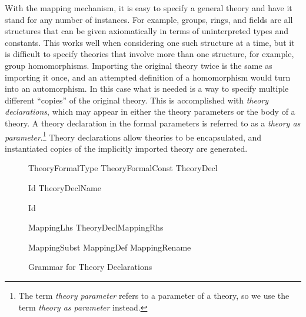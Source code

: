 \documentclass[11pt,twoside,openright,titlepage]{cslreport}
\def\mapb{\char"7B\char"7B}
\def\mape{\char"7D\char"7D}
\begin{document}
With the mapping mechanism, it is easy to specify a general theory and
have it stand for any number of instances.  For example, groups, rings,
and fields are all structures that can be given axiomatically in terms of
uninterpreted types and constants.  This works well when considering one
such structure at a time, but it is difficult to specify theories that
involve more than one structure, for example, group homomorphisms.
Importing the original theory twice is the same as importing it once, and
an attempted definition of a homomorphism would turn into an automorphism.
In this case what is needed is a way to specify multiple different
``copies'' of the original theory.  This is accomplished with \emph{theory
declarations}, which may appear in either the theory parameters or the
body of a theory.  A theory declaration in the formal parameters is
referred to as a \emph{theory as parameter}.\footnote{The term
\emph{theory parameter} refers to a parameter of a theory, so we use the
term \emph{theory as parameter} instead.}  Theory declarations allow
theories to be encapsulated, and instantiated copies of the implicitly
imported theory are generated.
\begin{figure}[!b]
\setlength{\sessionboxwidth}{\linewidth}
\addtolength{\sessionboxwidth}{-\arrayrulewidth}
\addtolength{\sessionboxwidth}{-\tabcolsep}
\begin{boxedminipage}[b]{\sessionboxwidth}
\begin{bnf}\smaller

{TheoryFormalType \choice TheoryFormalConst \choice TheoryDecl}

{Id \lit{:}  TheoryDeclName}

{ Id  }

{\lit{\mapb{}}  \lit{\mape{}}}

{MappingLhs TheoryDeclMappingRhs}

{MappingSubst \choice MappingDef \choice MappingRename}

{\lit{:=} }

{\lit{=} }

{\lit{::=} }

\end{bnf}
\end{boxedminipage}
\caption{Grammar for Theory Declarations}\label{theory-parameter-bnf}
\end{figure}
\end{document}
